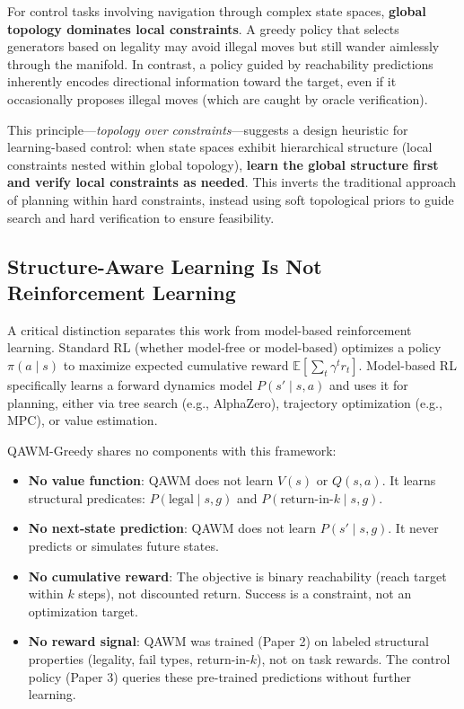 For control tasks involving navigation through complex state spaces, \textbf{global topology dominates local constraints}. A greedy policy that selects generators based on legality may avoid illegal moves but still wander aimlessly through the manifold. In contrast, a policy guided by reachability predictions inherently encodes directional information toward the target, even if it occasionally proposes illegal moves (which are caught by oracle verification).

This principle—\textit{topology over constraints}—suggests a design heuristic for learning-based control: when state spaces exhibit hierarchical structure (local constraints nested within global topology), \textbf{learn the global structure first and verify local constraints as needed}. This inverts the traditional approach of planning within hard constraints, instead using soft topological priors to guide search and hard verification to ensure feasibility.

\subsection{Structure-Aware Learning Is Not Reinforcement Learning}

A critical distinction separates this work from model-based reinforcement learning. Standard RL (whether model-free or model-based) optimizes a policy $\pi(a \mid s)$ to maximize expected cumulative reward $\mathbb{E}\left[\sum_t \gamma^t r_t\right]$. Model-based RL specifically learns a forward dynamics model $P(s' \mid s, a)$ and uses it for planning, either via tree search (e.g., AlphaZero), trajectory optimization (e.g., MPC), or value estimation.

QAWM-Greedy shares no components with this framework:

\begin{itemize}
\item \textbf{No value function}: QAWM does not learn $V(s)$ or $Q(s,a)$. It learns structural predicates: $P(\text{legal} \mid s, g)$ and $P(\text{return-in-}k \mid s, g)$.
\item \textbf{No next-state prediction}: QAWM does not learn $P(s' \mid s, g)$. It never predicts or simulates future states.
\item \textbf{No cumulative reward}: The objective is binary reachability (reach target within $k$ steps), not discounted return. Success is a constraint, not an optimization target.
\item \textbf{No reward signal}: QAWM was trained (Paper 2) on labeled structural properties (legality, fail types, return-in-$k$), not on task rewards. The control policy (Paper 3) queries these pre-trained predictions without further learning.
\end{itemize}

